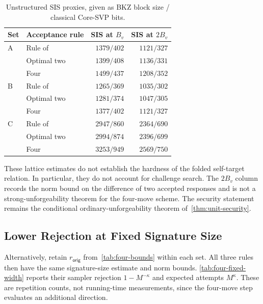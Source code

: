 \begin{table}[!htbp]
\centering
\begin{tabular}{llrr}
\toprule
Set & Acceptance rule & SIS at $B_v$ & SIS at $2B_v$\\
\midrule
A & Rule of~\cite{GartnerFull} & $1379/402$ & $1121/327$\\
  & Optimal two & $1399/408$ & $1136/331$\\
  & Four & $1499/437$ & $1208/352$\\
\midrule
B & Rule of~\cite{GartnerFull} & $1265/369$ & $1035/302$\\
  & Optimal two & $1281/374$ & $1047/305$\\
  & Four & $1377/402$ & $1121/327$\\
\midrule
C & Rule of~\cite{GartnerFull} & $2947/860$ & $2364/690$\\
  & Optimal two & $2994/874$ & $2396/699$\\
  & Four & $3253/949$ & $2569/750$\\
\bottomrule
\end{tabular}
\caption{Unstructured SIS proxies, given as BKZ block size / classical Core-SVP bits.}
\label{tab:four-lattice}
\end{table}

These lattice estimates do not establish the hardness of the folded self-target relation. In particular, they do not account for challenge search. The $2B_v$ column records the norm bound on the difference of two accepted responses and is not a strong-unforgeability theorem for the four-move scheme. The security statement remains the conditional ordinary-unforgeability theorem of~\cref{thm:unit-security}.

\subsection{Lower Rejection at Fixed Signature Size}

Alternatively, retain $r_{\mathsf{orig}}$ from~\cref{tab:four-bounds} within each set. All three rules then have the same signature-size estimate and norm bounds. \cref{tab:four-fixed-width} reports their sampler rejection $1-M^{-\kappa}$ and expected attempts $M^\kappa$. These are repetition counts, not running-time measurements, since the four-move step evaluates an additional direction.

